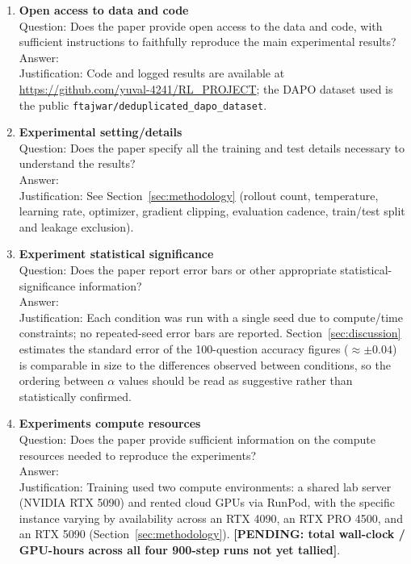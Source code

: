 \documentclass{article}
\newcommand{\pending}[1]{\textcolor{red!70!black}{\bf [PENDING: #1]}}
\begin{document}
\begin{enumerate}
\item \textbf{Open access to data and code}\\
    Question: Does the paper provide open access to the data and code, with
    sufficient instructions to faithfully reproduce the main experimental
    results?\\
    Answer: \answerYes{}\\
    Justification: Code and logged results are available at
    \url{https://github.com/yuval-4241/RL_PROJECT}; the DAPO dataset used is
    the public \texttt{ftajwar/deduplicated\_dapo\_dataset}.

\item \textbf{Experimental setting/details}\\
    Question: Does the paper specify all the training and test details
    necessary to understand the results?\\
    Answer: \answerYes{}\\
    Justification: See Section~\ref{sec:methodology} (rollout count,
    temperature, learning rate, optimizer, gradient clipping, evaluation
    cadence, train/test split and leakage exclusion).

\item \textbf{Experiment statistical significance}\\
    Question: Does the paper report error bars or other appropriate
    statistical-significance information?\\
    Answer: \answerNo{}\\
    Justification: Each condition was run with a single seed due to
    compute/time constraints; no repeated-seed error bars are reported.
    Section~\ref{sec:discussion} estimates the standard error of the
    100-question accuracy figures ($\approx\pm0.04$) is comparable in size
    to the differences observed between conditions, so the ordering
    between $\alpha$ values should be read as suggestive rather than
    statistically confirmed.

\item \textbf{Experiments compute resources}\\
    Question: Does the paper provide sufficient information on the compute
    resources needed to reproduce the experiments?\\
    Answer: \answerYes{}\\
    Justification: Training used two compute environments: a shared lab
    server (NVIDIA RTX 5090) and rented cloud GPUs via RunPod, with the
    specific instance varying by availability across an RTX 4090, an RTX
    PRO 4500, and an RTX 5090 (Section~\ref{sec:methodology}).
    \pending{total wall-clock / GPU-hours across all four 900-step runs not
    yet tallied}.


\end{enumerate}
\end{document}
